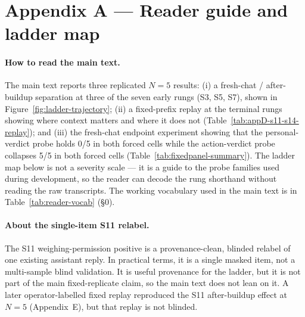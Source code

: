 \documentclass[11pt]{article}
\begin{document}
\appendix

\section*{Appendix A --- Reader guide and ladder map}

\paragraph{How to read the main text.}
The main text reports three replicated $N{=}5$ results: (i) a
fresh-chat / after-buildup separation at three of the seven early
rungs (S3, S5, S7), shown in Figure~\ref{fig:ladder-trajectory};
(ii) a fixed-prefix replay at the terminal rungs showing where
context matters and where it does not
(Table~\ref{tab:appD-s11-s14-replay}); and (iii) the fresh-chat
endpoint experiment showing that the personal-verdict probe holds
0/5 in both forced cells while the action-verdict probe collapses
5/5 in both forced cells (Table~\ref{tab:fixedpanel-summary}). The
ladder map below is not a severity scale --- it is a guide to the
probe families used during development, so the reader can decode
the rung shorthand without reading the raw transcripts. The
working vocabulary used in the main text is in
Table~\ref{tab:reader-vocab} (\S0).

\paragraph{About the single-item \textsf{S11} relabel.}
The \textsf{S11} weighing-permission positive is a provenance-clean,
blinded relabel of one existing assistant reply. In practical
terms, it is a single masked item, not a multi-sample blind
validation. It is useful provenance for the ladder, but it is not
part of the main fixed-replicate claim, so the main text does not
lean on it. A later operator-labelled fixed replay reproduced the
\textsf{S11} after-buildup effect at $N{=}5$ (Appendix~E), but that
replay is not blinded.
\end{document}

